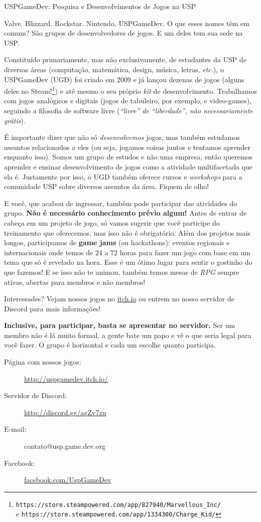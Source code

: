 \begin{subsecao}{USPGameDev: Pesquisa e Desenvolvimentos de Jogos na USP}


Valve. Blizzard. Rockstar. Nintendo. USPGameDev. O que esses nomes têm em
comum? São grupos de desenvolvedores de jogos. E um deles tem sua sede na USP.

Constituído primariamente, mas não exclusivamente, de estudantes da USP de
diversas áreas (computação, matemática, design, música, letras, \textit{etc}.),
o USPGameDev (UGD) foi criado em 2009 e já lançou dezenas de jogos (alguns
deles no Steam!\footnote{\texttt{https://store.steampowered.com/app/827940/Marvellous\_Inc/}
\\ e \texttt{https://store.steampowered.com/app/1334300/Charge\_Kid/}}) e até
mesmo o seu próprio \textit{kit} de desenvolvimento. Trabalhamos com jogos
analógicos e digitais (jogos de tabuleiro, por exemplo, e video-games),
seguindo a filosofia de software livre (\textit{``livre'' de ``liberdade'',
não necessariamente grátis}).

É importante dizer que não só \textit{desenvolvemos} jogos, mas também
estudamos assuntos relacionados a eles (ou seja, jogamos coisas juntos e
tentamos aprender enquanto isso). Somos um grupo de estudos e não uma empresa,
então queremos aprender e ensinar desenvolvimento de jogos como a atividade
multifacetada que ela é. Justamente por isso, o UGD também oferece cursos e
\textit{workshops} para a comunidade USP sobre diversos assuntos da área.
Fiquem de olho!

E você, que acabou de ingressar, também pode participar das atividades do grupo.
\textbf{Não é necessário conhecimento prévio algum!} Antes de entrar de cabeça
em um projeto de jogo, só vamos sugerir que você participe do treinamento que
oferecemos, mas isso não é obrigatório. Além dos projetos mais longos,
participamos de \textbf{game jams} (ou hackathons): eventos regionais e
internacionais onde temos de 24 a 72 horas para fazer um jogo com base em um
tema que só é revelado na hora. Esse é um ótimo lugar para sentir o gostinho
do que fazemos! E se isso não te animou, também temos mesas de \textit{RPG}
sempre ativas, abertas para membros e não membros!

Interessades? Vejam nossos jogos no \url{itch.io} ou entrem no nosso servidor
de Discord para mais informações!

\textbf{Inclusive, para participar, basta se apresentar no servidor.} 
Ser um membro não é lá muito formal, a gente bate um papo e vê 
o que seria legal para você fazer. O grupo é horizontal e cada 
um escolhe quanto participa.

\begin{description}
  \item[Página com nossos jogos:] \url{http://uspgamedev.itch.io/}
  \item[Servidor de Discord:] \url{http://discord.gg/agZv7zu}
  \item[E-mail:] contato@usp.game.dev.org
  \item[Facebook:] \url{facebook.com/UspGameDev}
\end{description}

\end{subsecao}

